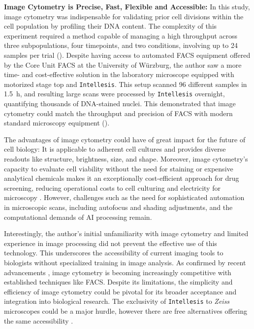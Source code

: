 \textbf{Image Cytometry is Precise, Fast, Flexible and Accessible:}
In this study, image cytometry was indispensable for validating prior cell
divisions within the \nMAina cell population by profiling their DNA content. The
complexity of this experiment required a method capable of managing a high
throughput across three subpopulations, four timepoints, and two conditions,
involving up to 24 samples per trial (). Despite
having access to automated \ac{FACS} equipment offered by the Core Unit FACS at
the University of Würzburg, the author saw a more time- and cost-effective
solution in the laboratory microscope equipped with motorized stage top and
\texttt{Intellesis}. This setup scanned 96 different samples in \SI{1.5}{\hour},
and resulting large scans were processed by \texttt{Intellesis} overnight,
quantifying thousands of DNA-stained nuclei. This demonstrated that image
cytometry could match the throughput and precision of \ac{FACS} with modern
standard microscopy equipment ().

The advantages of image cytometry could have of great impact for the future of
cell biology: It is applicable to adherent cell cultures
\cite{roukosCellCycleStaging2015} and provides diverse readouts like structure,
brightness, size, and shape. Moreover, image cytometry’s capacity to evaluate
cell viability without the need for staining or expensive analytical chemicals
makes it an exceptionally cost-efficient approach for drug screening, reducing
operational costs to cell culturing and electricity for microscopy
\cite{pattaroneLearningDeepFeatures2021}.  However, challenges such as the need
for sophisticated automation in microscopic scans, including autofocus and
shading adjustments, and the computational demands of AI processing remain.


Interestingly, the author’s initial unfamiliarity with image cytometry and
limited experience in image processing did not prevent the effective use of this
technology. This underscores the accessibility of current imaging tools to
biologists without specialized training in image analysis. As confirmed by
recent advancements \cite{nittaRapidHighthroughputCell2023}, image cytometry is
becoming increasingly competitive with established techniques like \ac{FACS}.
Despite its limitations, the simplicity and efficiency of image cytometry could
be pivotal for its broader acceptance and integration into biological research.
The exclusivity of \texttt{Intellesis} to \textit{Zeiss} microscopes could be a
major hurdle, however there are free alternatives offering the same
accessibility \cite{bergIlastikInteractiveMachine2019}.




